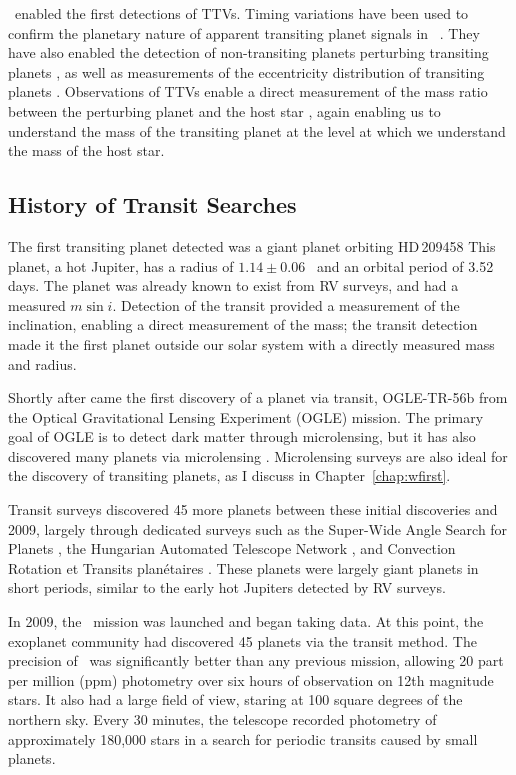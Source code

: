 \kep\ enabled the first detections of TTVs. 
Timing variations have been used to confirm the planetary nature of apparent transiting
planet signals in \kep\ \citep{Holman10, Rowe14}.
They have also enabled the detection of non-transiting planets perturbing transiting
planets \citep[e.g.][]{Ballard11, Nesvorny13}, as well as measurements of the eccentricity 
distribution of transiting planets \citep{Hadden14}.
Observations of TTVs enable a direct measurement of the mass ratio between the
perturbing planet and the host star \citep{Agol05, LithwickWu12},
again enabling us to understand the mass of the transiting planet at the level 
at which we understand the mass of the host star.
 


\subsection{History of Transit Searches}
The first transiting planet detected was a giant planet orbiting HD\,209458 
\citep{Charbonneau00, Henry00}
This planet, a hot Jupiter, has a radius of $1.14 \pm 0.06$ \rsun\ and an orbital 
period of 3.52 days.
The planet was already known to exist from RV surveys, and had a measured $m \sin i$.
Detection of the transit provided a measurement of the inclination, enabling a 
direct measurement of the mass; the transit detection made it the first planet outside our solar system with a directly measured mass and radius.

Shortly after came the first discovery of a planet via transit, OGLE-TR-56b \citep{Udalski02} from the Optical Gravitational Lensing Experiment (OGLE) mission.
The primary goal of OGLE is to detect dark matter through microlensing, but it has also discovered 
many planets via microlensing \citep{Sumi11, Cassan12}.
Microlensing surveys are also ideal for the discovery of transiting planets, as 
I discuss in Chapter~\ref{chap:wfirst}.

Transit surveys discovered 45 more planets between these initial discoveries and 2009, largely through dedicated surveys such as the Super-Wide Angle Search for Planets \citep[SuperWASP,][]{Street03}, the Hungarian Automated Telescope Network 
\citep[HATNet,][]{Bakos02}, and
Convection Rotation et Transits plan\'{e}taires \citep[CoRoT,][]{Auvergne09}.
These planets were largely giant planets in short periods, similar to the early hot Jupiters
detected by RV surveys. 

In 2009, the \kep\ mission \citep{Borucki10} was launched and began taking data.
At this point, the exoplanet community had discovered 45 planets via the transit
method.
The precision of \kep\ was significantly better than any previous mission, allowing
20 part per million (ppm) photometry over six hours of observation on 12th magnitude
stars. 
It also had a large field of view, staring at 100 square degrees of the northern sky.
Every 30 minutes, the telescope recorded photometry of approximately 180,000 stars in a
search for periodic transits caused by small planets.

